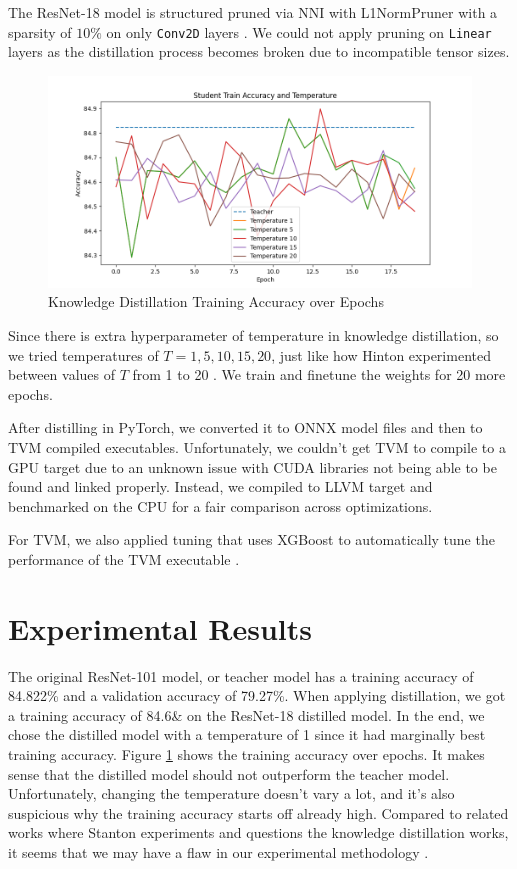 \documentclass{article}
\begin{document}
The ResNet-18 model is structured pruned via NNI with L1NormPruner with a sparsity of $10\%$ on only \verb|Conv2D| layers \cite{l1prune}. We could not apply pruning on \verb|Linear| layers as the distillation process becomes broken due to incompatible tensor sizes.

\begin{figure}
    \centerline{\includegraphics[width=7in]{../proj4/figures/kd_training.png}}
    \caption{Knowledge Distillation Training Accuracy over Epochs}
    \label{fig:kd-training}
\end{figure}

Since there is extra hyperparameter of temperature in knowledge distillation, so we tried temperatures of $T = 1, 5, 10, 15, 20$, just like how Hinton experimented between values of $T$ from 1 to 20 \cite{distillation}. We train and finetune the weights for 20 more epochs. 

After distilling in PyTorch, we converted it to ONNX model files and then to TVM compiled executables. Unfortunately, we couldn't get TVM to compile to a GPU target due to an unknown issue with CUDA libraries not being able to be found and linked properly. Instead, we compiled to LLVM target and benchmarked on the CPU for a fair comparison across optimizations.

For TVM, we also applied tuning that uses XGBoost to automatically tune the performance of the TVM executable \cite{xgboost}.

\section{Experimental Results}
The original ResNet-101 model, or teacher model has a training accuracy of 84.822\% and a validation accuracy of 79.27\%. When applying distillation, we got a training accuracy of 84.6\& on the ResNet-18 distilled model. In the end, we chose the distilled model with a temperature of 1 since it had marginally best training accuracy. Figure \ref{fig:kd-training} shows the training accuracy over epochs. It makes sense that the distilled model should not outperform the teacher model. Unfortunately, changing the temperature doesn't vary a lot, and it's also suspicious why the training accuracy starts off already high. Compared to related works where Stanton experiments and questions the knowledge distillation works, it seems that we may have a flaw in our experimental methodology \cite{distillation-works}.
\end{document}
